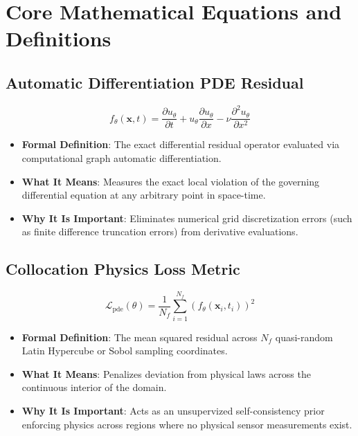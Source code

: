 \documentclass[11pt,a4paper]{article}
\theoremstyle{definition}
\begin{document}
\section{Core Mathematical Equations and Definitions}

\subsection{Automatic Differentiation PDE Residual}
{\boldmath
\begin{equation}
f_\theta(\mathbf{x}, t) = \frac{\partial u_\theta}{\partial t} + u_\theta \frac{\partial u_\theta}{\partial x} - \nu \frac{\partial^2 u_\theta}{\partial x^2}
\end{equation}
}
\begin{itemize}
    \item \textbf{Formal Definition}: The exact differential residual operator evaluated via computational graph automatic differentiation.
    \item \textbf{What It Means}: Measures the exact local violation of the governing differential equation at any arbitrary point in space-time.
    \item \textbf{Why It Is Important}: Eliminates numerical grid discretization errors (such as finite difference truncation errors) from derivative evaluations.
\end{itemize}

\subsection{Collocation Physics Loss Metric}
{\boldmath
\begin{equation}
\mathcal{L}_{\text{pde}}(\theta) = \frac{1}{N_f} \sum_{i=1}^{N_f} \left( f_\theta(\mathbf{x}_i, t_i) \right)^2
\end{equation}
}
\begin{itemize}
    \item \textbf{Formal Definition}: The mean squared residual across $N_f$ quasi-random Latin Hypercube or Sobol sampling coordinates.
    \item \textbf{What It Means}: Penalizes deviation from physical laws across the continuous interior of the domain.
    \item \textbf{Why It Is Important}: Acts as an unsupervized self-consistency prior enforcing physics across regions where no physical sensor measurements exist.
\end{itemize}
\end{document}
